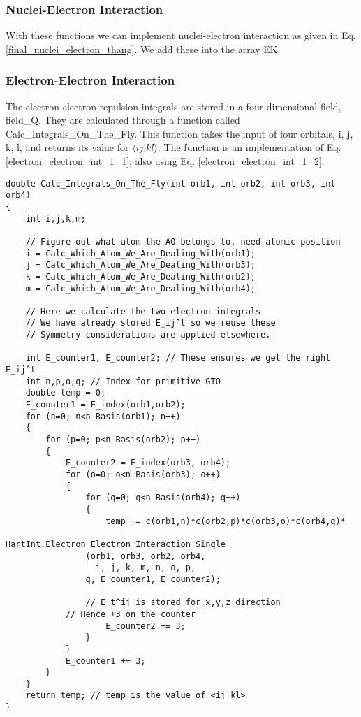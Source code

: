 \subsubsection{Nuclei-Electron Interaction}
With these functions we can implement nuclei-electron interaction as given in Eq. \eqref{final_nuclei_electron_thang}. We add these into the array EK. 

\subsubsection{Electron-Electron Interaction}
The electron-electron repulsion integrals are stored in a four dimensional field, field\_Q. They are calculated through a function called Calc\_Integrals\_On\_The\_Fly. This function takes the input of four orbitals, i, j, k, l, and returns its value for $\langle i j | k l \rangle$. The function is an implementation of Eq. \eqref{electron_electron_int_1_1}, also using Eq. \eqref{electron_electron_int_1_2}. \\

\begin{lstlisting}
double Calc_Integrals_On_The_Fly(int orb1, int orb2, int orb3, int orb4)
{    
    int i,j,k,m;

    // Figure out what atom the AO belongs to, need atomic position
    i = Calc_Which_Atom_We_Are_Dealing_With(orb1);
    j = Calc_Which_Atom_We_Are_Dealing_With(orb3);
    k = Calc_Which_Atom_We_Are_Dealing_With(orb2);
    m = Calc_Which_Atom_We_Are_Dealing_With(orb4);

    // Here we calculate the two electron integrals
    // We have already stored E_ij^t so we reuse these
    // Symmetry considerations are applied elsewhere.

    int E_counter1, E_counter2; // These ensures we get the right E_ij^t
    int n,p,o,q; // Index for primitive GTO
    double temp = 0;
    E_counter1 = E_index(orb1,orb2);
    for (n=0; n<n_Basis(orb1); n++)
    {
        for (p=0; p<n_Basis(orb2); p++)
        {
            E_counter2 = E_index(orb3, orb4);
            for (o=0; o<n_Basis(orb3); o++)
            {
                for (q=0; q<n_Basis(orb4); q++)
                {
                    temp += c(orb1,n)*c(orb2,p)*c(orb3,o)*c(orb4,q)*
                            HartInt.Electron_Electron_Interaction_Single
                (orb1, orb3, orb2, orb4,
                  i, j, k, m, n, o, p,
                q, E_counter1, E_counter2);

                // E_t^ij is stored for x,y,z direction
            // Hence +3 on the counter
                    E_counter2 += 3;
                }
            }
            E_counter1 += 3;
        }
    }
    return temp; // temp is the value of <ij|kl>
}
\end{lstlisting}




